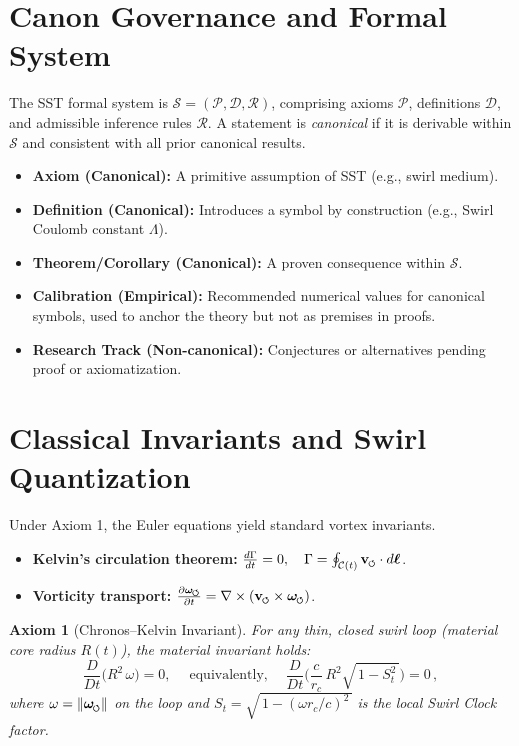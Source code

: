 \documentclass[11pt]{article}
\newcommand{\swirlarrow}{%
    \mathchoice{\mkern-2mu\scriptstyle\boldsymbol{\circlearrowleft}}%
    {\mkern-2mu\scriptstyle\boldsymbol{\circlearrowleft}}%
    {\mkern-2mu\scriptscriptstyle\boldsymbol{\circlearrowleft}}%
    {\mkern-2mu\scriptscriptstyle\boldsymbol{\circlearrowleft}}%
}
\newcommand{\vswirl}{\mathbf{v}_{\swirlarrow}}
\newcommand{\omegas}{\boldsymbol{\omega}_{\swirlarrow}}  %
\newtheorem{axiom}{Axiom}
\begin{document}
\section{Canon Governance and Formal System}
    \label{sec:canon_governance}
    The SST formal system is $\mathcal{S}=(\mathcal{P},\mathcal{D},\mathcal{R})$, comprising axioms $\mathcal{P}$, definitions $\mathcal{D}$, and admissible inference rules $\mathcal{R}$. A statement is \emph{canonical} if it is derivable within $\mathcal{S}$ and consistent with all prior canonical results.
    \begin{itemize}
    \item \textbf{Axiom (Canonical):} A primitive assumption of SST (e.g., swirl medium).
    \item \textbf{Definition (Canonical):} Introduces a symbol by construction (e.g., Swirl Coulomb constant $\Lambda$).
    \item \textbf{Theorem/Corollary (Canonical):} A proven consequence within $\mathcal{S}$.
    \item \textbf{Calibration (Empirical):} Recommended numerical values for canonical symbols, used to anchor the theory but not as premises in proofs.
    \item \textbf{Research Track (Non-canonical):} Conjectures or alternatives pending proof or axiomatization.
    \end{itemize}

\section{Classical Invariants and Swirl Quantization}
    \label{sec:classical_invariants}
    Under Axiom 1, the Euler equations yield standard vortex invariants.
    \begin{itemize}
    \item \textbf{Kelvin's circulation theorem:} $\frac{d\Gamma}{dt}=0, \quad \Gamma=\oint_{\mathcal{C}(t)} \vswirl\cdot d\boldsymbol{\ell}$.
    \item \textbf{Vorticity transport:} $\pdv{\omegas}{t} = \nabla\times(\vswirl\times \omegas)$.
    \end{itemize}

    \begin{axiom}[Chronos–Kelvin Invariant]
    \label{ax:chronos-kelvin}
    For any thin, closed swirl loop (material core radius $R(t)$), the material invariant holds:
    \begin{equation}
    \boxed{\;
    \frac{D}{Dt}\!\Big(R^2\,\omega\Big)=0,
        \;} \quad \text{equivalently,} \quad
    \boxed{\;
    \frac{D}{Dt}\!\Big(
    \frac{c}{r_c}\,R^2 \sqrt{\,1-S_t^2\,}
    \Big)=0\,,
        \;}
    \label{eq:CK}
    \end{equation}
    where $\omega=\|\omegas\|$ on the loop and $S_t=\sqrt{\,1-(\omega r_c/c)^2\,}$ is the local Swirl Clock factor.
    \end{axiom}
\end{document}
